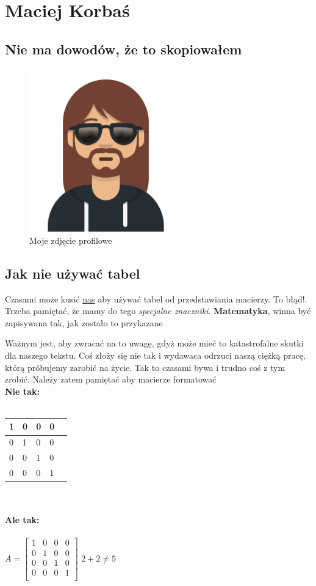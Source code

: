 \clearpage
\section{Maciej Korbaś}
\subsection{Nie ma dowodów, że to skopiowałem}
\begin{figure}[h]
    \centering
    \includegraphics[height=200pt]{pictures/makous/profile.png}
    \caption{Moje zdjęcie profilowe}
\end{figure}
\subsection{Jak nie używać tabel}
Czasami może kusić \underline{nas} aby używać tabel od przedstawiania macierzy. \large{To błąd!}\normalsize. Trzeba pamiętać, że mamy do tego \emph{specjalne znaczniki}. \textbf{Matematyka}, winna być zapisywana tak, jak zostało to przykazane

Ważnym jest, aby zwracać na to uwagę, gdyż może mieć to katastrofalne skutki dla naszego tekstu. Coś złoży się nie tak i wydawaca odrzuci naszą ciężką pracę, którą próbujemy zarobić na życie. Tak to czasami bywa i trudno coś z tym zrobić. Należy zatem pamiętać aby macierze formatować\\
\textbf{Nie tak:}\\\\
\begin{tabular}{|l|l|l|l|l|}
\hline
1 & 0 & 0 & 0 \\ \hline
0 & 1 & 0 & 0 \\ \hline
0 & 0 & 1 & 0 \\ \hline
0 & 0 & 0 & 1 \\ \hline
\end{tabular}\\\\
\textbf{Ale tak:}\\\\
$A = \begin{bmatrix}
1 & 0 & 0 & 0 \\ 
0 & 1 & 0 & 0 \\ 
0 & 0 & 1 & 0 \\ 
0 & 0 & 0 & 1 \\ 
\end{bmatrix}$
$2+2 \ne 5$

